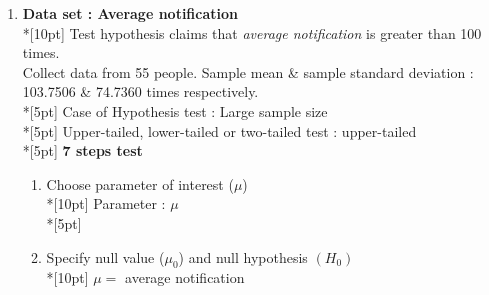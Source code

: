 \begin{enumerate}
\begin{enumerate}[label=1.\arabic*]
            \begin{equation*}
                \alpha &: 0.05
            \end{equation*}
            \begin{equation}
                \begin{align}
                    1-\alpha &= 1-0.05 &&= 0.95\\
                    z_a &= z_{0.05} &&= 1.6449\\
                \end{align}
            \end{equation}
            \begin{equation*}
                z &\geq 1.6449
            \end{equation*}
            \item Determine whether we reject null hypothesis or not\\*[10pt]
                Test static does not fall inside the rejection region. Null hypothesis is not rejected.\\*[5pt]
            \item Conclude the problem\\*[10pt]
            We do not reject the null hypothesis. Average screen duration is 7 Hrs.
        \end{enumerate}
    \item \textbf{Data set : Average notification}\\*[10pt]
        Test hypothesis claims that \textit{average notification} is greater than 100 times.\\
        Collect data from 55 people. Sample mean & sample standard deviation : 103.7506 \& 74.7360 times respectively.\\*[5pt]
        Case of Hypothesis test : Large sample size\\*[5pt]
        Upper-tailed, lower-tailed or two-tailed test : upper-tailed\\*[5pt]
        \textbf{7 steps test}
        \begin{enumerate}[label=2.\arabic*]
            \item Choose parameter of interest (\(\mu\))\\*[10pt]
                Parameter : \(\mu\)\\*[5pt]
            \item Specify null value (\(\mu_0\)) and null hypothesis \((H_0)\)\\*[10pt]
                \(\mu=\) average notification
            \begin{equation}

\end{equation}
\end{enumerate}
\end{enumerate}
